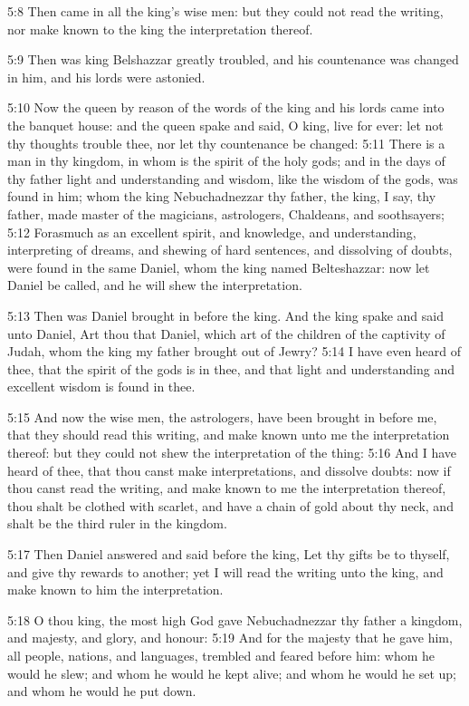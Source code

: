 5:8 Then came in all the king's wise men: but they could not read the
writing, nor make known to the king the interpretation thereof.

5:9 Then was king Belshazzar greatly troubled, and his countenance was
changed in him, and his lords were astonied.

5:10 Now the queen by reason of the words of the king and his lords
came into the banquet house: and the queen spake and said, O king,
live for ever: let not thy thoughts trouble thee, nor let thy
countenance be changed: 5:11 There is a man in thy kingdom, in whom is
the spirit of the holy gods; and in the days of thy father light and
understanding and wisdom, like the wisdom of the gods, was found in
him; whom the king Nebuchadnezzar thy father, the king, I say, thy
father, made master of the magicians, astrologers, Chaldeans, and
soothsayers; 5:12 Forasmuch as an excellent spirit, and knowledge, and
understanding, interpreting of dreams, and shewing of hard sentences,
and dissolving of doubts, were found in the same Daniel, whom the king
named Belteshazzar: now let Daniel be called, and he will shew the
interpretation.

5:13 Then was Daniel brought in before the king. And the king spake
and said unto Daniel, Art thou that Daniel, which art of the children
of the captivity of Judah, whom the king my father brought out of
Jewry?  5:14 I have even heard of thee, that the spirit of the gods is
in thee, and that light and understanding and excellent wisdom is
found in thee.

5:15 And now the wise men, the astrologers, have been brought in
before me, that they should read this writing, and make known unto me
the interpretation thereof: but they could not shew the interpretation
of the thing: 5:16 And I have heard of thee, that thou canst make
interpretations, and dissolve doubts: now if thou canst read the
writing, and make known to me the interpretation thereof, thou shalt
be clothed with scarlet, and have a chain of gold about thy neck, and
shalt be the third ruler in the kingdom.

5:17 Then Daniel answered and said before the king, Let thy gifts be
to thyself, and give thy rewards to another; yet I will read the
writing unto the king, and make known to him the interpretation.

5:18 O thou king, the most high God gave Nebuchadnezzar thy father a
kingdom, and majesty, and glory, and honour: 5:19 And for the majesty
that he gave him, all people, nations, and languages, trembled and
feared before him: whom he would he slew; and whom he would he kept
alive; and whom he would he set up; and whom he would he put down.

